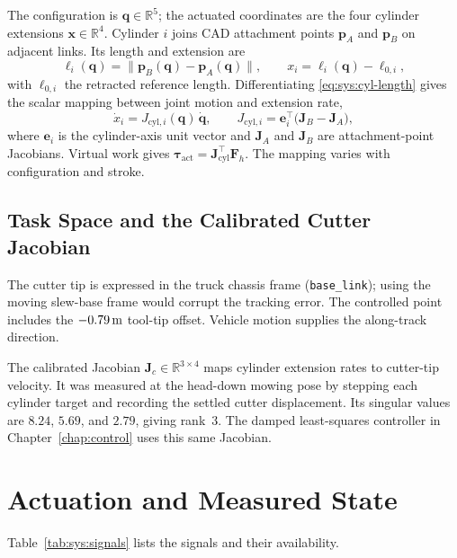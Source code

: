 The configuration is $\bm{q} \in \mathbb{R}^5$; the actuated coordinates are
the four cylinder extensions $\bm{x} \in \mathbb{R}^4$. Cylinder $i$ joins CAD
attachment points $\bm{p}_A$ and $\bm{p}_B$ on adjacent links. Its length and
extension are
%
\begin{equation}
  \label{eq:sys:cyl-length}
  \ell_i(\bm{q}) = \bigl\| \bm{p}_B(\bm{q}) - \bm{p}_A(\bm{q}) \bigr\|,
  \qquad
  x_i = \ell_i(\bm{q}) - \ell_{0,i},
\end{equation}
%
with $\ell_{0,i}$ the retracted reference length. Differentiating
\eqref{eq:sys:cyl-length} gives the scalar mapping between joint motion
and extension rate,
%
\begin{equation}
  \label{eq:sys:cyl-jac}
  \dot{x}_i = J_{\mathrm{cyl},i}(\bm{q})\, \dot{\bm{q}},
  \qquad
  J_{\mathrm{cyl},i} = \bm{e}_i^{\!\top}
  \bigl( \bm{J}_B - \bm{J}_A \bigr),
\end{equation}
%
where $\bm{e}_i$ is the cylinder-axis unit vector and $\bm{J}_A$ and
$\bm{J}_B$ are attachment-point Jacobians. Virtual work gives
$\bm{\tau}_{\mathrm{act}}=\bm{J}_{\mathrm{cyl}}^{\top}\bm{F}_h$.
The mapping varies with configuration and stroke.

\subsection{Task Space and the Calibrated Cutter Jacobian}
\label{sec:sys:task-jacobian}

The cutter tip is expressed in the truck chassis frame
(\texttt{base\_link}); using the moving slew-base frame would corrupt the
tracking error. The controlled point includes the $\unit[-0.79]{m}$ tool-tip
offset. Vehicle motion supplies the along-track direction.

The calibrated Jacobian $\bm{J}_c\in\mathbb{R}^{3\times4}$ maps cylinder
extension rates to cutter-tip velocity. It was measured at the head-down
mowing pose by stepping each cylinder target and recording the settled cutter
displacement. Its singular values are $8.24$, $5.69$, and $2.79$, giving
rank~3. The damped least-squares controller in Chapter~\ref{chap:control}
uses this same Jacobian.

\section{Actuation and Measured State}
\label{sec:sys:actuation}

Table~\ref{tab:sys:signals} lists the signals and their availability.

